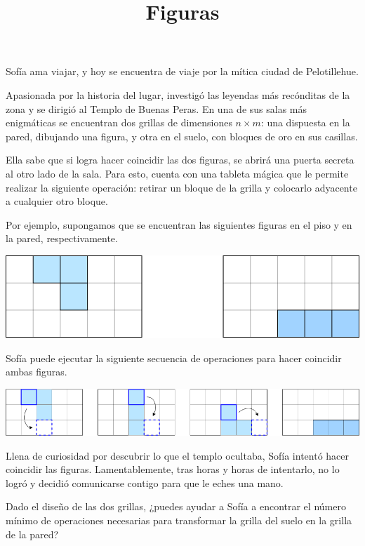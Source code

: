 \documentclass{oci}
\title{Figuras}
\begin{document}
\begin{problemDescription}
Sofía ama viajar, y hoy se encuentra de viaje por la mítica ciudad de Pelotillehue.

Apasionada por la historia del lugar, investigó las leyendas más recónditas de la zona y se dirigió al Templo de Buenas Peras. En una de sus salas más enigmáticas se encuentran dos grillas de dimensiones $n \times m$: una dispuesta en la pared, dibujando una figura, y otra en el suelo, con bloques de oro en sus casillas.

Ella sabe que si logra hacer coincidir las dos figuras, se abrirá una puerta secreta al otro lado de la sala. Para esto, cuenta con una tableta mágica que le permite realizar la siguiente operación: retirar un bloque de la grilla y colocarlo adyacente a cualquier otro bloque.

Por ejemplo, supongamos que se encuentran las siguientes figuras en el piso y en la pared, respectivamente.

\begin{center}
    \includegraphics[scale=0.7]{figura1.png}
\end{center}

Sofía puede ejecutar la siguiente secuencia de operaciones para hacer coincidir ambas figuras.

\begin{center}
    \includegraphics[scale=0.5]{figurras2.png}
\end{center}

Llena de curiosidad por descubrir lo que el templo ocultaba, Sofía intentó hacer coincidir las figuras. Lamentablemente, tras horas y horas de intentarlo, no lo logró y decidió comunicarse contigo para que le eches una mano.

Dado el diseño de las dos grillas, ¿puedes ayudar a Sofía a encontrar el número mínimo de operaciones necesarias para transformar la grilla del suelo en la grilla de la pared?

\end{problemDescription}
\end{document}
